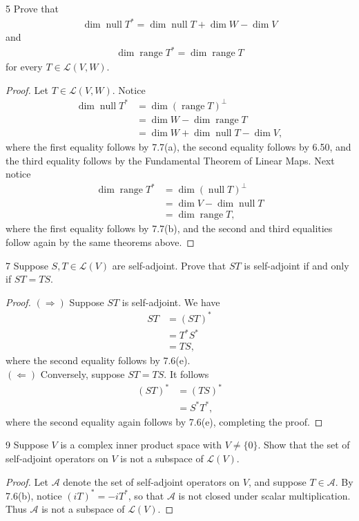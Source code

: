 \documentclass{extarticle}
\newenvironment{problem}[1]{\begin{prob*}{#1}{}}{\end{prob*}}
\newcommand{\Hom}{\mathcal{L}}
\DeclareMathOperator{\Null}{null}
\DeclareMathOperator{\Range}{range}
\begin{document}
\begin{problem}{5}
Prove that 
\begin{align*}
\dim\Null T^\ast = \dim\Null T + \dim W - \dim V
\end{align*}
and
\begin{align*}
\dim\Range T^* = \dim\Range T
\end{align*}
for every $T\in\Hom(V, W)$.
\end{problem}
\begin{proof}
Let $T\in\Hom(V, W)$.  Notice
\begin{align*}
\dim\Null T^\ast &= \dim\left(\Range T\right)^\perp\\
&=\dim W - \dim\Range T\\
&=\dim W + \dim\Null T - \dim V,
\end{align*}
where the first equality follows by 7.7(a), the second equality follows by 6.50, and the third equality follows by the Fundamental Theorem of Linear Maps.  Next notice
\begin{align*}
\dim\Range T^\ast &= \dim\left(\Null T\right)^\perp\\
&= \dim V - \dim\Null T\\
&= \dim \Range T,
\end{align*}
where the first equality follows by 7.7(b), and the second and third equalities follow again by the same theorems above.
\end{proof}

\begin{problem}{7}
Suppose $S,T\in\Hom(V)$ are self-adjoint.  Prove that $ST$ is self-adjoint if and only if $ST=TS$.
\end{problem}
\begin{proof}
$(\Rightarrow)$ Suppose $ST$ is self-adjoint.  We have
\begin{align*}
ST &= (ST)^\ast\\
&= T^\ast S^\ast\\
&=TS,
\end{align*}
where the second equality follows by 7.6(e).\\
\indent $(\Leftarrow)$ Conversely, suppose $ST = TS$.  It follows
\begin{align*}
(ST)^\ast &= (TS)^\ast\\
&= S^\ast T^\ast,
\end{align*}
where the second equality again follows by 7.6(e), completing the proof.
\end{proof}

\begin{problem}{9}
Suppose $V$ is a complex inner product space with $V\neq\{0\}$.  Show that the set of self-adjoint operators on $V$ is not a subspace of $\Hom(V)$.
\end{problem}
\begin{proof}
Let $\mathcal{A}$ denote the set of self-adjoint operators on $V$, and suppose $T\in\mathcal{A}$.  By 7.6(b), notice $(iT)^\ast = -iT^\ast$, so that $\mathcal{A}$ is not closed under scalar multiplication.  Thus $\mathcal{A}$ is not a subspace of $\Hom(V)$.
\end{proof}
\end{document}
